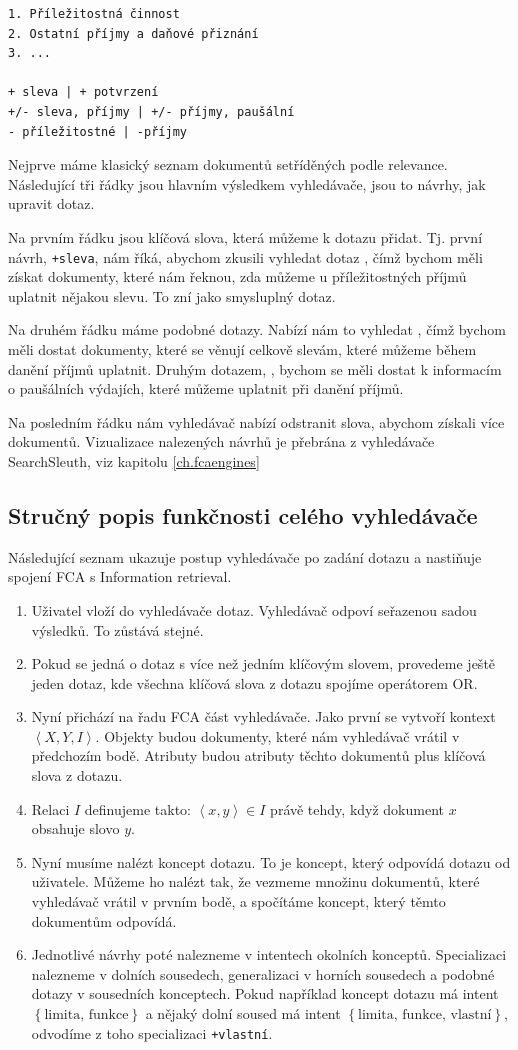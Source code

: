\documentclass[12pt]{article}
\newcommand{\code}[1]{\texttt{#1}}
\newcommand{\ssection}[1]{\subsection{#1}}
\newcommand{\adds}[1]{\left\{#1\right\}}
\newcommand{\addsp}[1]{\left<#1\right>}
\newcommand{\context}{\addsp{X, Y, I}}
\begin{document}
\begin{verbatim}
1. Příležitostná činnost
2. Ostatní příjmy a daňové přiznání
3. ...

+ sleva | + potvrzení
+/- sleva, příjmy | +/- příjmy, paušální
- příležitostné | -příjmy
\end{verbatim}

Nejprve máme klasický seznam dokumentů setříděných podle relevance. Následující tři řádky jsou hlavním výsledkem vyhledávače, jsou to návrhy, jak upravit dotaz. 

Na prvním řádku jsou klíčová slova, která můžeme k dotazu přidat. Tj. první návrh, \code{+sleva}, nám říká, abychom zkusili vyhledat dotaz , čímž bychom měli získat dokumenty, které nám řeknou, zda můžeme u příležitostných příjmů uplatnit nějakou slevu. To zní jako smysluplný dotaz. 

Na druhém řádku máme podobné dotazy. Nabízí nám to vyhledat , čímž bychom měli dostat dokumenty, které se věnují celkově slevám, které můžeme během danění příjmů uplatnit. Druhým dotazem, , bychom se měli dostat k informacím o paušálních výdajích, které můžeme uplatnit při danění příjmů. 

Na posledním řádku nám vyhledávač nabízí odstranit slova, abychom získali více dokumentů. Vizualizace nalezených návrhů je přebrána z vyhledávače Search\-Sleuth, viz kapitolu \ref{ch.fcaengines}


\ssection{Stručný popis funkčnosti celého vyhledávače}
Následující seznam ukazuje postup vyhledávače po zadání dotazu a nastiňuje spojení FCA s Information retrieval. 
\begin{enumerate}
	\item Uživatel vloží do vyhledávače dotaz. Vyhledávač odpoví seřazenou sadou výsledků. To zůstává stejné.
	\item Pokud se jedná o dotaz s více než jedním klíčovým slovem, provedeme ještě jeden dotaz, kde všechna klíčová slova z dotazu spojíme operátorem OR.
	\item Nyní přichází na řadu FCA část vyhledávače. Jako první se vytvoří kontext $\context$. Objekty budou dokumenty, které nám vyhledávač vrátil v předchozím bodě. Atributy budou atributy těchto dokumentů plus klíčová slova z dotazu. 
	\item Relaci $I$ definujeme takto: $\addsp{x, y}\in I$ právě tehdy, když dokument $x$ obsahuje slovo $y$.
	\item Nyní musíme nalézt koncept dotazu. To je koncept, který odpovídá dotazu od uživatele. Můžeme ho nalézt tak, že vezmeme množinu dokumentů, které vyhledávač vrátil v prvním bodě, a spočítáme koncept, který těmto dokumentům odpovídá. 
	\item Jednotlivé návrhy poté nalezneme v intentech okolních konceptů. Specializaci nalezneme v dolních sousedech, generalizaci v horních sousedech a podobné dotazy v sousedních konceptech. Pokud například koncept dotazu má intent $\adds{\mbox{limita, funkce}}$ a nějaký dolní soused má intent $\adds{\mbox{limita, funkce, vlastní}}$, odvodíme z toho specializaci \code{+vlastní}. 
\end{enumerate}
\end{document}
